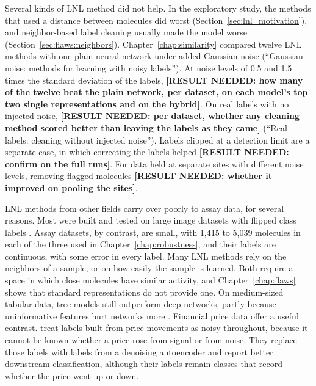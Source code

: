 Several kinds of LNL method did not help. In the exploratory study, the methods that used a distance between molecules did worst (Section~\ref{sec:lnl_motivation}), and neighbor-based label cleaning usually made the model worse (Section~\ref{sec:flaws:neighbors}). Chapter~\ref{chap:similarity} compared twelve LNL methods with one plain neural network under added Gaussian noise (``Gaussian noise: methods for learning with noisy labels''). At noise levels of 0.5 and 1.5 times the standard deviation of the labels, \textbf{[RESULT NEEDED: how many of the twelve beat the plain network, per dataset, on each model's top two single representations and on the hybrid]}. On real labels with no injected noise, \textbf{[RESULT NEEDED: per dataset, whether any cleaning method scored better than leaving the labels as they came]} (``Real labels: cleaning without injected noise''). Labels clipped at a detection limit are a separate case, in which correcting the labels helped \textbf{[RESULT NEEDED: confirm on the full runs]}. For data held at separate sites with different noise levels, removing flagged molecules \textbf{[RESULT NEEDED: whether it improved on pooling the sites]}.

LNL methods from other fields carry over poorly to assay data, for several reasons. Most were built and tested on large image datasets with flipped class labels \citep{Song2022}. Assay datasets, by contrast, are small, with 1,415 to 5,039 molecules in each of the three used in Chapter~\ref{chap:robustness}, and their labels are continuous, with some error in every label. Many LNL methods rely on the neighbors of a sample, or on how easily the sample is learned. Both require a space in which close molecules have similar activity, and Chapter~\ref{chap:flaws} shows that standard representations do not provide one. On medium-sized tabular data, tree models still outperform deep networks, partly because uninformative features hurt networks more \citep{Grinsztajn2022}. Financial price data offer a useful contrast. \citet{Ma2022} treat labels built from price movements as noisy throughout, because it cannot be known whether a price rose from signal or from noise. They replace those labels with labels from a denoising autoencoder and report better downstream classification, although their labels remain classes that record whether the price went up or down.

